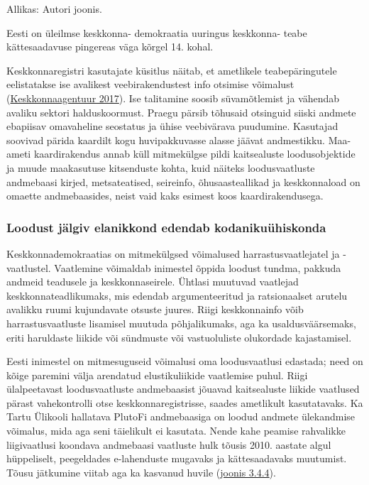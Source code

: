 \documentclass[estonian,]{article}
\begin{document}
\begin{imgsource}
{Allikas:} Autori joonis.
\end{imgsource}

\begin{blockquote-left}
Eesti on üleilmse keskkonna- demokraatia uuringus keskkonna- teabe
kättesaadavuse pingereas väga kõrgel 14. kohal.
\end{blockquote-left}

Keskkonnaregistri kasutajate küsitlus näitab, et ametlikele teabepäringutele eelistatakse ise avalikest veebirakendustest info otsimise võimalust (\protect\hyperlink{Keskkonnaagentuur2017}{Keskkonnaagentuur 2017}). Ise talitamine soosib süvamõtlemist ja vähendab avaliku sektori halduskoormust. Praegu pärsib tõhusaid otsinguid siiski andmete ebapiisav omavaheline seostatus ja ühise veebivärava puudumine. Kasutajad soovivad pärida kaardilt kogu huvipakkuvasse alasse jäävat andmestikku. Maa-ameti kaardirakendus annab küll mitmekülgse pildi kaitsealuste loodusobjektide ja muude maakasutuse kitsenduste kohta, kuid näiteks loodusvaatluste andmebaasi kirjed, metsateatised, seireinfo, õhusaasteallikad ja keskkonnaload on omaette andmebaasides, neist vaid kaks esimest koos kaardirakendusega.

\hypertarget{loodust-juxe4lgiv-elanikkond-edendab-kodanikuuxfchiskonda}{%
\subsubsection*{Loodust jälgiv elanikkond edendab kodanikuühiskonda}\label{loodust-juxe4lgiv-elanikkond-edendab-kodanikuuxfchiskonda}}

Keskkonnademokraatias on mitmekülgsed võimalused harrastusvaatlejatel ja -vaatlustel. Vaatlemine võimaldab inimestel õppida loodust tundma, pakkuda andmeid teadusele ja keskkonnaseirele. Ühtlasi muutuvad vaatlejad keskkonnateadlikumaks, mis edendab argumenteeritud ja ratsionaalset arutelu avalikku ruumi kujundavate otsuste juures. Riigi keskkonnainfo võib harrastusvaatluste lisamisel muutuda põhjalikumaks, aga ka usaldusväärsemaks, eriti haruldaste liikide või sündmuste või vastuoluliste olukordade kajastamisel.

Eesti inimestel on mitmesuguseid võimalusi oma loodusvaatlusi edastada; need on kõige paremini välja arendatud elustikuliikide vaatlemise puhul. Riigi ülalpeetavast loodusvaatluste andmebaasist jõuavad kaitsealuste liikide vaatlused pärast vahekontrolli otse keskkonnaregistrisse, saades ametlikult kasutatavaks. Ka Tartu Ülikooli hallatava PlutoFi andmebaasiga on loodud andmete ülekandmise võimalus, mida aga seni täielikult ei kasutata. Nende kahe peamise rahvalikke liigivaatlusi koondava andmebaasi vaatluste hulk tõusis 2010. aastate algul hüppeliselt, peegeldades e-lahenduste mugavaks ja kättesaadavaks muutumist. Tõusu jätkumine viitab aga ka kasvanud huvile (\protect\hyperlink{figure344}{joonis 3.4.4}).
\end{document}
